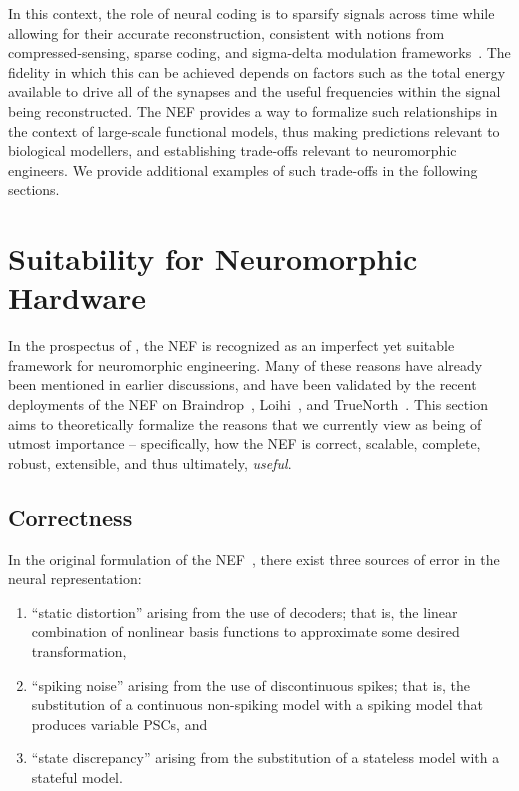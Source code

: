 In this context, the role of neural coding is to sparsify signals across time while allowing for their accurate reconstruction, consistent with notions from compressed-sensing, sparse coding, and sigma-delta modulation frameworks~\citep{coulter2010adaptive, chklovskii2012neuronal, yoon2017lif}.
The fidelity in which this can be achieved depends on factors such as the total energy available to drive all of the synapses and the useful frequencies within the signal being reconstructed.
The NEF provides a way to formalize such relationships in the context of large-scale functional models, thus making predictions relevant to biological modellers, and establishing trade-offs relevant to neuromorphic engineers.
We provide additional examples of such trade-offs in the following sections.

\section{Suitability for Neuromorphic Hardware}
\label{sec:nef-suitability}

In the prospectus of \citet{boahen2017neuromorph}, the NEF is recognized as an imperfect yet suitable framework for neuromorphic engineering.
Many of these reasons have already been mentioned in earlier discussions, and have been 
validated by the recent deployments of the NEF on Braindrop~\citep{braindrop2019}, Loihi~\citep{blouw2018a}, and TrueNorth~\citep{fischl2018}.
This section aims to theoretically formalize the reasons that we currently view as being of utmost importance -- specifically, how the NEF is correct, scalable, complete, robust, extensible, and thus ultimately, \emph{useful}.

\subsection{Correctness} %
\label{sec:spike-coding}

In the original formulation of the NEF~\citep{eliasmith2003a}, there exist three sources of error in the neural representation:
\begin{enumerate}
\item ``static distortion'' arising from the use of decoders; that is, the linear combination of nonlinear basis functions to approximate some desired transformation,
\item ``spiking noise'' arising from the use of discontinuous spikes; that is, the substitution of a continuous non-spiking model with a spiking model that produces variable PSCs, and
\item ``state discrepancy'' arising from the substitution of a stateless model with a stateful model.
\end{enumerate}

